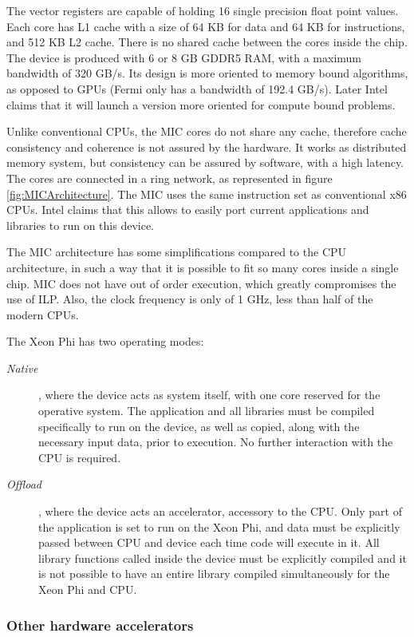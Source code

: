 The vector registers are capable of holding 16 single precision float point values. Each core has L1 cache with a size of 64 KB for data and 64 KB for instructions, and 512 KB L2 cache. There is no shared cache between the cores inside the chip. The device is produced with 6 or 8 GB GDDR5 RAM, with a maximum bandwidth of 320 GB/s. Its design is more oriented to memory bound algorithms, as opposed to GPUs (Fermi only has a bandwidth of 192.4 GB/s). Later Intel claims that it will launch a version more oriented for compute bound problems.

Unlike conventional CPUs, the MIC cores do not share any cache, therefore cache consistency and coherence is not assured by the hardware. It works as distributed memory system, but consistency can be assured by software, with a high latency. The cores are connected in a ring network, as represented in figure \ref{fig:MICArchitecture}. The MIC uses the same instruction set as conventional x86 CPUs. Intel claims that this allows to easily port current applications and libraries to run on this device.

The MIC architecture has some simplifications compared to the CPU architecture, in such a way that it is possible to fit so many cores inside a single chip. MIC does not have out of order execution, which greatly compromises the use of ILP. Also, the clock frequency is only of 1 GHz, less than half of the modern CPUs.

The Xeon Phi has two operating modes:

\begin{description}
	\item[\textit{Native}], where the device acts as system itself, with one core reserved for the operative system. The application and all libraries must be compiled specifically to run on the device, as well as copied, along with the necessary input data, prior to execution. No further interaction with the CPU is required.
	\item[\textit{Offload}], where the device acts an accelerator, accessory to the CPU. Only part of the application is set to run on the Xeon Phi, and data must be explicitly passed between CPU and device each time code will execute in it. All library functions called inside the device must be explicitly compiled and it is not possible to have an entire library compiled simultaneously for the Xeon Phi and CPU.
\end{description}

\subsubsection*{Other hardware accelerators}
\label{OtherAccelerators}

